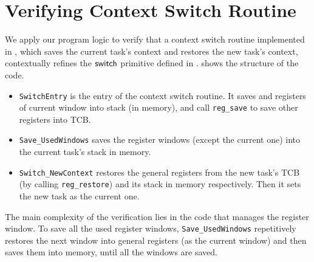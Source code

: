 \section{Verifying Context Switch Routine}
\label{sec:ctxswitch}

\indent
We apply our program logic to verify
that a context switch routine implemented in \sparc,
which saves the current task's context and 
restores the new task's context, 
contextually refines the $\mathsf{switch}{}$ primitive 
defined in \Sec{\ref{subsec:High-level Pseudo-SPARCv8 Language}}. 
\Fig{\ref{fig:The Structure of Context Switch Routine}}
shows the structure of the code.
\begin{center}
    
	\label{fig:The Structure of Context Switch Routine}
\end{center}
\begin{itemize}
    \item \texttt{SwitchEntry}
    is the entry of the context switch routine. 
    It saves \localRN{} and \inRN{} registers of current
    window into stack (in memory), and call 
    \texttt{reg\_save} to save other registers into TCB.
    
    \item
    \texttt{Save\_UsedWindows} saves
	the register windows (except the current one)
    into the current task's stack in memory. 

    \item     
    \texttt{Switch\_NewContext}
    restores the general registers from the new task's TCB 
    (by calling \texttt{reg\_restore})
    and its stack in memory 
    respectively. Then it sets the new task as
    the current one.
\end{itemize}

The main complexity of the verification lies in
the code that manages the register window.
To save all the used 
register windows, \texttt{Save\_UsedWindows}
repetitively restores the next window into general registers
(as the current window)
and then saves them into memory, until all the windows are saved.

